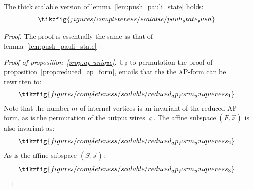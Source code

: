 \begin{lemma}
  \label{lem:push_pauli_state_thick}
  The thick scalable version of lemma~\ref{lem:push_pauli_state} holds:
  \begin{equation*}
    \tikzfig{figures/completeness/scalable/pauli_state_push}
  \end{equation*}
\end{lemma}
\begin{proof}
The proof is essentially the same as that of lemma~\ref{lem:push_pauli_state}
\end{proof}
\begin{proof}[Proof of proposition~\ref{prop:ap-unique}]
  Up to permutation the proof of proposition~\ref{prop:reduced_ap_form}, entails that the the AP-form can be rewritten to:
  \begin{equation}
    \tikzfig{figures/completeness/scalable/reduced_ap_form_uniqueness_1}
  \end{equation}
  Note that the number \(m\) of internal vertices is an invariant of the reduced AP-form, as is the permutation of the output wires \(\varsigma\).
  The affine subspace \((F,\vec x)\) is also invariant as:
  \begin{equation}
    \tikzfig{figures/completeness/scalable/reduced_ap_form_uniqueness_2}
  \end{equation}
   As is the affine subspace \((S,\vec s)\):
  \begin{equation}
    \tikzfig{figures/completeness/scalable/reduced_ap_form_uniqueness_3}
  \end{equation}
\end{proof}

